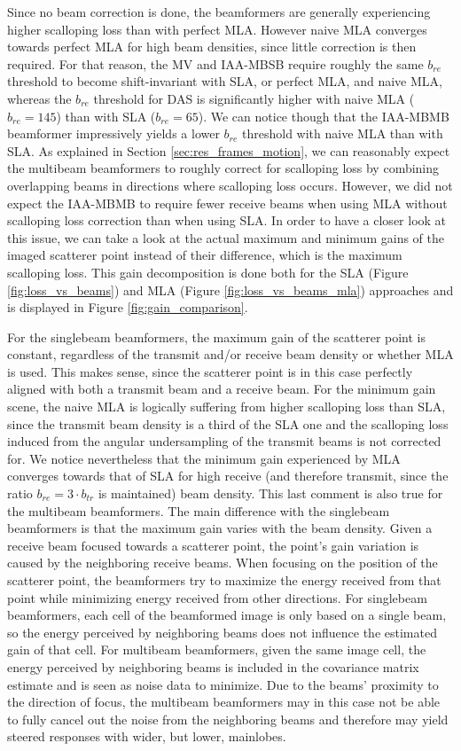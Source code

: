 Since no beam correction is done, the beamformers are generally experiencing higher scalloping loss than with perfect MLA. However naive MLA converges towards perfect MLA for high beam densities, since little correction is then required.
For that reason, the MV and IAA-MBSB require roughly the same $b_{re}$ threshold to become shift-invariant with SLA, or perfect MLA, and naive MLA, whereas the $b_{re}$ threshold for DAS is significantly higher with naive MLA ($b_{re} = 145$) than with SLA ($b_{re} = 65$).
We can notice though that the IAA-MBMB beamformer impressively yields a lower $b_{re}$ threshold with naive MLA than with SLA.
As explained in Section \ref{sec:res_frames_motion}, we can reasonably expect the multibeam beamformers to roughly correct for scalloping loss by combining overlapping beams in directions where scalloping loss occurs.
However, we did not expect the IAA-MBMB to require fewer receive beams when using MLA without scalloping loss correction than when using SLA.
In order to have a closer look at this issue, we can take a look at the actual maximum and minimum gains of the imaged scatterer point instead of their difference, which is the maximum scalloping loss.
This gain decomposition is done both for the SLA (Figure \ref{fig:loss_vs_beams}) and MLA (Figure \ref{fig:loss_vs_beams_mla}) approaches and is displayed in Figure \ref{fig:gain_comparison}.

For the singlebeam beamformers, the maximum gain of the scatterer point is constant, regardless of the transmit and/or receive beam density or whether MLA is used.
This makes sense, since the scatterer point is in this case perfectly aligned with both a transmit beam and a receive beam.
For the minimum gain scene, the naive MLA is logically suffering from higher scalloping loss than SLA, since the transmit beam density is a third of the SLA one and the scalloping loss induced from the angular undersampling of the transmit beams is not corrected for.
We notice nevertheless that the minimum gain experienced by MLA converges towards that of SLA for high receive (and therefore transmit, since the ratio $b_{re} = 3 \cdot b_{tr}$ is maintained) beam density.
This last comment is also true for the multibeam beamformers.
The main difference with the singlebeam beamformers is that the maximum gain varies with the beam density.
Given a receive beam focused towards a scatterer point, the point's gain variation is caused by the neighboring receive beams.
When focusing on the position of the scatterer point, the beamformers try to maximize the energy received from that point while minimizing energy received from other directions.
For singlebeam beamformers, each cell of the beamformed image is only based on a single beam, so the energy perceived by neighboring beams does not influence the estimated gain of that cell.
For multibeam beamformers, given the same image cell, the energy perceived by neighboring beams is included in the covariance matrix estimate and is seen as noise data to minimize.
Due to the beams' proximity to the direction of focus, the multibeam beamformers may in this case not be able to fully cancel out the noise from the neighboring beams and therefore may yield steered responses with wider, but lower, mainlobes.

